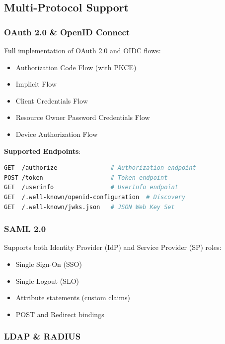 \subsection{Multi-Protocol Support}

\subsubsection{OAuth 2.0 \& OpenID Connect}

Full implementation of OAuth 2.0 \cite{rfc6749} and OIDC \cite{oidc} flows:

\begin{itemize}
  \item Authorization Code Flow (with PKCE)
  \item Implicit Flow
  \item Client Credentials Flow
  \item Resource Owner Password Credentials Flow
  \item Device Authorization Flow
\end{itemize}

\textbf{Supported Endpoints}:
\begin{lstlisting}[language=bash]
GET  /authorize               # Authorization endpoint
POST /token                   # Token endpoint
GET  /userinfo                # UserInfo endpoint
GET  /.well-known/openid-configuration  # Discovery
GET  /.well-known/jwks.json   # JSON Web Key Set
\end{lstlisting}

\subsubsection{SAML 2.0}

Supports both Identity Provider (IdP) and Service Provider (SP) roles:

\begin{itemize}
  \item Single Sign-On (SSO)
  \item Single Logout (SLO)
  \item Attribute statements (custom claims)
  \item POST and Redirect bindings
\end{itemize}

\subsubsection{LDAP \& RADIUS}

